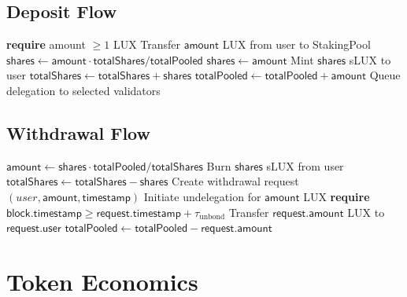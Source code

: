 \documentclass[11pt,a4paper]{article}
\begin{document}
\subsection{Deposit Flow}

\begin{algorithm}[H]
\caption{LUX Deposit and sLUX Minting}
\label{alg:deposit}
\begin{algorithmic}[1]
    \State \textbf{require} amount $\geq 1$ LUX
    \State Transfer $\mathsf{amount}$ LUX from user to StakingPool
    \State $\mathsf{shares} \gets \mathsf{amount} \cdot \mathsf{totalShares} / \mathsf{totalPooled}$
        \State $\mathsf{shares} \gets \mathsf{amount}$ 
    \EndIf
    \State Mint $\mathsf{shares}$ sLUX to user
    \State $\mathsf{totalShares} \gets \mathsf{totalShares} + \mathsf{shares}$
    \State $\mathsf{totalPooled} \gets \mathsf{totalPooled} + \mathsf{amount}$
    \State Queue delegation to selected validators
\EndProcedure
\end{algorithmic}
\end{algorithm}

\subsection{Withdrawal Flow}

\begin{algorithm}[H]
\caption{sLUX Withdrawal}
\label{alg:withdraw}
\begin{algorithmic}[1]
    \State $\mathsf{amount} \gets \mathsf{shares} \cdot \mathsf{totalPooled} / \mathsf{totalShares}$
    \State Burn $\mathsf{shares}$ sLUX from user
    \State $\mathsf{totalShares} \gets \mathsf{totalShares} - \mathsf{shares}$
    \State Create withdrawal request $(user, \mathsf{amount}, \mathsf{timestamp})$
    \State Initiate undelegation for $\mathsf{amount}$ LUX
\EndProcedure
{}
    \State \textbf{require} $\mathsf{block.timestamp} \geq \mathsf{request.timestamp} + \tau_{\text{unbond}}$
    \State Transfer $\mathsf{request.amount}$ LUX to $\mathsf{request.user}$
    \State $\mathsf{totalPooled} \gets \mathsf{totalPooled} - \mathsf{request.amount}$
\EndProcedure
\end{algorithmic}
\end{algorithm}

\section{Token Economics}\label{sec:tokens}
\end{document}
